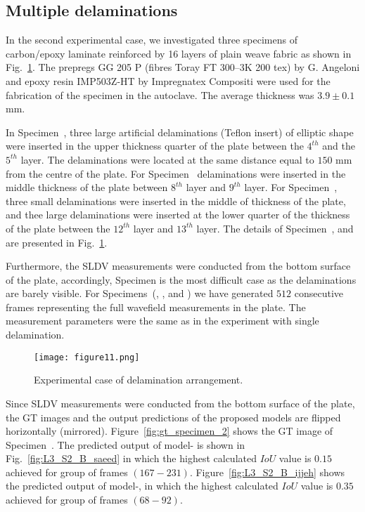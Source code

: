 \subsection{Multiple delaminations}
In the second experimental case, we investigated three specimens of carbon/epoxy laminate reinforced by 16 layers of plain weave fabric as shown in Fig.~\ref{fig:plate_delam_arrangment}. 
The prepregs GG 205 P (fibres Toray FT 300–3K 200 tex) by G. Angeloni and epoxy resin IMP503Z‐HT by Impregnatex Compositi were used for the fabrication of the specimen in the autoclave. 
The average thickness was \(3.9 \pm 0.1\) mm.

In Specimen~, three large artificial delaminations (Teflon insert) of elliptic shape were inserted in the upper thickness quarter of the plate between the \(4^{th}\) and the \(5^{th}\) layer.
The delaminations were located at the same distance equal to \(150\) mm from the centre of the plate.
For Specimen~ delaminations were inserted in the middle thickness of the plate between \(8^{th}\) layer and \(9^{th}\) layer.
For Specimen~, three small delaminations were inserted in the middle of thickness of the plate, and thee large delaminations were inserted at the lower quarter of the thickness of the plate between the \(12^{th}\) layer and \(13^{th}\) layer.
The details of Specimen~,  and  are presented in Fig.~\ref{fig:plate_delam_arrangment}.

Furthermore, the SLDV measurements were conducted from the bottom surface of the plate, accordingly, Specimen  is the most difficult case as the delaminations are barely visible.
For Specimens~(, , and )  we have generated \(512\) consecutive frames representing the full wavefield measurements in the plate.
The measurement parameters were the same as in the experiment with single delamination.
\begin{figure}[!h]
	\centering
	\texttt{[image: figure11.png]}
	\caption{Experimental case of delamination arrangement.}
	\label{fig:plate_delam_arrangment}
\end{figure}

Since SLDV measurements were conducted from the bottom surface of the plate, the GT images and the output predictions of the proposed models are flipped horizontally (mirrored).
Figure~\ref{fig:gt_specimen_2} shows the GT image of Specimen~.
The predicted output of model- is shown in Fig.~\ref{fig:L3_S2_B_saeed} in which the highest calculated \(IoU\) value is \(0.15\) achieved for group of frames \((167-231)\).
Figure~\ref{fig:L3_S2_B_ijjeh} shows the predicted output of model-, in which the highest calculated \(IoU\) value is \(0.35\) achieved for group of frames \((68-92)\).

